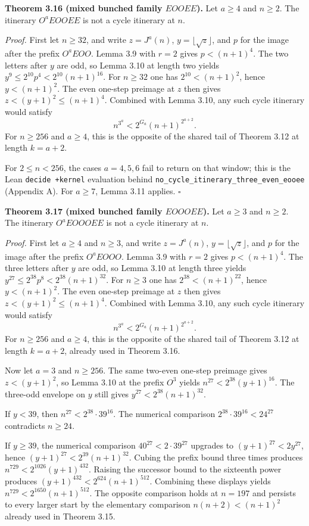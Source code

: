 \documentclass[12pt]{article}
\begin{document}
\textbf{Theorem 3.16 (mixed bunched family \(EOOEE\)).} Let \(a\ge 4\)
and \(n\ge 2\). The itinerary \(O^aEOOEE\) is not a cycle itinerary at
\(n\).

\emph{Proof.} First let \(n\ge 32\), and write \(z=J^a(n)\),
\(y=\lfloor\sqrt z\rfloor\), and \(p\) for the image after the prefix
\(O^aEOO\). Lemma 3.9 with \(r=2\) gives \(p<(n+1)^4\). The two letters
after \(y\) are odd, so Lemma 3.10 at length two yields
\(y^9\le 2^{10}p^4<2^{10}(n+1)^{16}\). For \(n\ge 32\) one has
\(2^{10}<(n+1)^2\), hence \(y<(n+1)^2\). The even one-step preimage at
\(z\) then gives \(z<(y+1)^2\le(n+1)^4\). Combined with Lemma 3.10, any
such cycle itinerary would satisfy \[
n^{3^a}<2^{G_a}(n+1)^{2^{a+2}}.
\] For \(n\ge 256\) and \(a\ge 4\), this is the opposite of the shared
tail of Theorem 3.12 at length \(k=a+2\).

For \(2\le n<256\), the cases \(a=4,5,6\) fail to return on that window;
this is the Lean \texttt{decide\ +kernel} evaluation behind
\texttt{\nolinkurl{no_cycle_itinerary_three_even_eooee}} (Appendix A).
For \(a\ge 7\), Lemma 3.11 applies. \(\square\)

\textbf{Theorem 3.17 (mixed bunched family \(EOOOEE\)).} Let \(a\ge 3\)
and \(n\ge 2\). The itinerary \(O^aEOOOEE\) is not a cycle itinerary at
\(n\).

\emph{Proof.} First let \(a\ge 4\) and \(n\ge 3\), and write
\(z=J^a(n)\), \(y=\lfloor\sqrt z\rfloor\), and \(p\) for the image after
the prefix \(O^aEOOO\). Lemma 3.9 with \(r=2\) gives \(p<(n+1)^4\). The
three letters after \(y\) are odd, so Lemma 3.10 at length three yields
\(y^{27}\le 2^{38}p^8<2^{38}(n+1)^{32}\). For \(n\ge 3\) one has
\(2^{38}<(n+1)^{22}\), hence \(y<(n+1)^2\). The even one-step preimage
at \(z\) then gives \(z<(y+1)^2\le(n+1)^4\). Combined with Lemma 3.10,
any such cycle itinerary would satisfy \[
n^{3^a}<2^{G_a}(n+1)^{2^{a+2}}.
\] For \(n\ge 256\) and \(a\ge 4\), this is the opposite of the shared
tail of Theorem 3.12 at length \(k=a+2\), already used in Theorem 3.16.

Now let \(a=3\) and \(n\ge 256\). The same two-even one-step preimage
gives \(z<(y+1)^2\), so Lemma 3.10 at the prefix \(O^3\) yields
\(n^{27}<2^{38}(y+1)^{16}\). The three-odd envelope on \(y\) still gives
\(y^{27}<2^{38}(n+1)^{32}\).

If \(y<39\), then \(n^{27}<2^{38}\cdot 39^{16}\). The numerical
comparison \(2^{38}\cdot 39^{16}<24^{27}\) contradicts \(n\ge 24\).

If \(y\ge 39\), the numerical comparison \(40^{27}<2\cdot 39^{27}\)
upgrades to \((y+1)^{27}<2y^{27}\), hence
\((y+1)^{27}<2^{39}(n+1)^{32}\). Cubing the prefix bound three times
produces \(n^{729}<2^{1026}(y+1)^{432}\). Raising the successor bound to
the sixteenth power produces \((y+1)^{432}<2^{624}(n+1)^{512}\).
Combining these displays yields \(n^{729}<2^{1650}(n+1)^{512}\). The
opposite comparison holds at \(n=197\) and persists to every larger
start by the elementary comparison \(n(n+2)<(n+1)^2\) already used in
Theorem 3.15.
\end{document}
